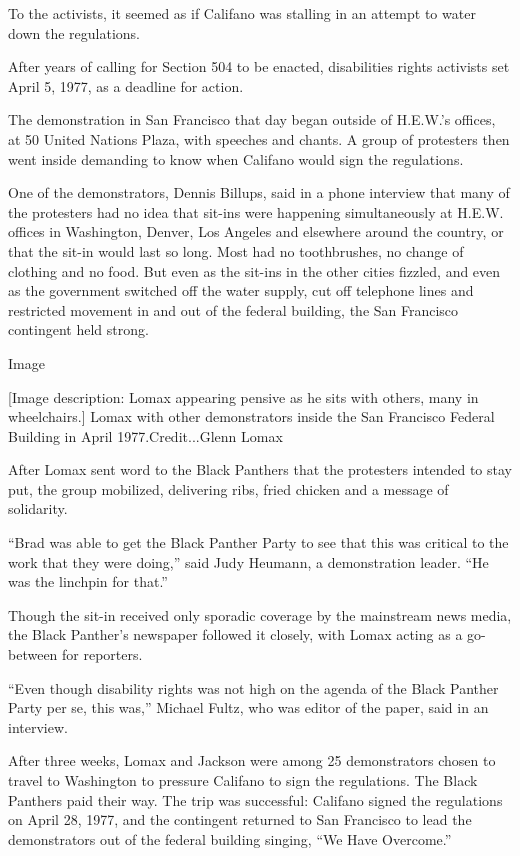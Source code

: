 To the activists, it seemed as if Califano was stalling in an attempt to
water down the regulations.

After years of calling for Section 504 to be enacted, disabilities
rights activists set April 5, 1977, as a deadline for action.

The demonstration in San Francisco that day began outside of H.E.W.'s
offices, at 50 United Nations Plaza, with speeches and chants. A group
of protesters then went inside demanding to know when Califano would
sign the regulations.

One of the demonstrators, Dennis Billups, said in a phone interview that
many of the protesters had no idea that sit-ins were happening
simultaneously at H.E.W. offices in Washington, Denver, Los Angeles and
elsewhere around the country, or that the sit-in would last so long.
Most had no toothbrushes, no change of clothing and no food. But even as
the sit-ins in the other cities fizzled, and even as the government
switched off the water supply, cut off telephone lines and restricted
movement in and out of the federal building, the San Francisco
contingent held strong.

Image

{[}Image description: Lomax appearing pensive as he sits with others,
many in wheelchairs.{]} Lomax with other demonstrators inside the San
Francisco Federal Building in April 1977.Credit...Glenn Lomax

After Lomax sent word to the Black Panthers that the protesters intended
to stay put, the group mobilized, delivering ribs, fried chicken and a
message of solidarity.

``Brad was able to get the Black Panther Party to see that this was
critical to the work that they were doing,'' said Judy Heumann, a
demonstration leader. ``He was the linchpin for that.''

Though the sit-in received only sporadic coverage by the mainstream news
media, the Black Panther's newspaper followed it closely, with Lomax
acting as a go-between for reporters.

``Even though disability rights was not high on the agenda of the Black
Panther Party per se, this was,'' Michael Fultz, who was editor of the
paper, said in an interview.

After three weeks, Lomax and Jackson were among 25 demonstrators chosen
to travel to Washington to pressure Califano to sign the regulations.
The Black Panthers paid their way. The trip was successful: Califano
signed the regulations on April 28, 1977, and the contingent returned to
San Francisco to lead the demonstrators out of the federal building
singing, ``We Have Overcome.''

